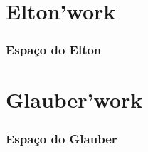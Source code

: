 \documentclass{beamer}
\begin{document}
\section{Elton'work}

\begin{frame}
 \frametitle{Espaço do Elton}
\end{frame}

\section{Glauber'work}

\begin{frame}
 \frametitle{Espaço do Glauber}
\end{frame}
\end{document}
